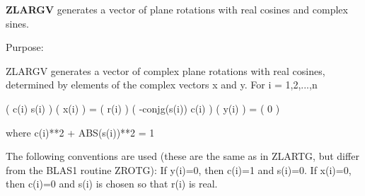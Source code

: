 {\bfseries Z\+L\+A\+R\+G\+V} generates a vector of plane rotations with real cosines and complex sines. 

 \begin{DoxyParagraph}{Purpose\+: }
\begin{DoxyVerb} ZLARGV generates a vector of complex plane rotations with real
 cosines, determined by elements of the complex vectors x and y.
 For i = 1,2,...,n

    (        c(i)   s(i) ) ( x(i) ) = ( r(i) )
    ( -conjg(s(i))  c(i) ) ( y(i) ) = (   0  )

    where c(i)**2 + ABS(s(i))**2 = 1

 The following conventions are used (these are the same as in ZLARTG,
 but differ from the BLAS1 routine ZROTG):
    If y(i)=0, then c(i)=1 and s(i)=0.
    If x(i)=0, then c(i)=0 and s(i) is chosen so that r(i) is real.\end{DoxyVerb}
 
\end{DoxyParagraph}


